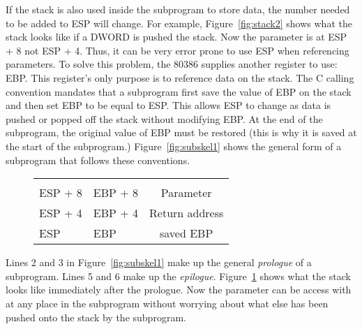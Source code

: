 If the stack is also used inside the subprogram to store data, the
number needed to be added to ESP will change. For example,
Figure~\ref{fig:stack2} shows what the stack looks like if a DWORD is
pushed the stack. Now the parameter is at {\code ESP + 8} not {\code
ESP + 4}. Thus, it can be very error prone to use ESP when referencing
parameters. To solve this problem, the 80386 supplies another register
to use: EBP. This register's only purpose is to reference data on the
stack. The C calling convention mandates that a subprogram first save
the value of EBP on the stack and then set EBP to be equal to ESP.
This allows ESP to change as data is pushed or popped off the stack
without modifying EBP. At the end of the subprogram, the original
value of EBP must be restored (this is why it is saved at the start of
the subprogram.)  Figure~\ref{fig:subskel1} shows the general form of
a subprogram that follows these conventions.

\begin{figure}[t]
\centering
\begin{tabular}{ll|c|}
\cline{3-3}
&  & \\ \cline{3-3}
ESP + 8 & EBP + 8 & Parameter \\ \cline{3-3}
ESP + 4 & EBP + 4 & Return address \\ \cline{3-3}
ESP     & EBP     & saved EBP \\ \cline{3-3}
\end{tabular}
\caption{}
\label{fig:stack3}
\end{figure}


Lines 2 and 3 in Figure~\ref{fig:subskel1} make up the general \emph{prologue}
of a subprogram. Lines 5 and 6 make up the \emph{epilogue}. 
Figure~\ref{fig:stack3} shows what the stack looks like immediately
after the prologue. Now the parameter can be access with {\code [EBP + 8]}
at any place in the subprogram without worrying about what else has
been pushed onto the stack by the subprogram.

